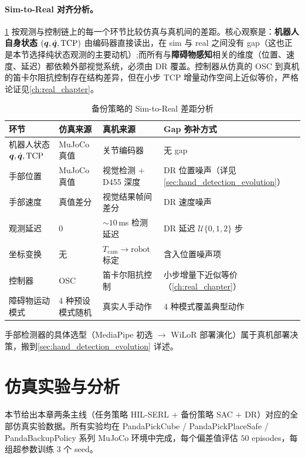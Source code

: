 \paragraph{Sim-to-Real 对齐分析。}\cref{tab:backup_sim2real} 按观测与控制链上的每一个环节比较仿真与真机间的差距。核心观察是：\textbf{机器人自身状态} $(\bm{q}, \dot{\bm{q}}, \text{TCP})$ 由编码器直接读出，在 sim 与 real 之间没有 gap（这也正是本节选择纯状态观测的主要动机）;而所有与\textbf{障碍物感知}相关的维度（位置、速度、延迟）都依赖外部视觉系统，必须由 DR 覆盖。控制器从仿真的 OSC 到真机的笛卡尔阻抗控制存在结构差异，但在小步 TCP 增量动作空间上近似等价，严格论证见\cref{ch:real_chapter}。

\begin{table}[htbp]
  \centering
  \caption{备份策略的 Sim-to-Real 差距分析}
  \label{tab:backup_sim2real}
  \footnotesize
  \begin{tabular}{@{}llll@{}}
    \toprule
    环节 & 仿真来源 & 真机来源 & Gap 弥补方式 \\
    \midrule
    机器人状态 $\bm{q}, \dot{\bm{q}}, \text{TCP}$ & MuJoCo 真值 & 关节编码器 & 无 gap \\
    手部位置 & MuJoCo 真值 & 视觉检测 $+$ D455 深度 & DR 位置噪声（详见\cref{sec:hand_detection_evolution}） \\
    手部速度 & 真值差分 & 视觉结果帧间差分 & DR 速度噪声 \\
    观测延迟 & $0$ & $\sim 10$\,ms 检测延迟 & DR 延迟 $\mathcal{U}\{0,1,2\}$ 步 \\
    坐标变换 & 无 & $T_\text{cam}\!\to\!\text{robot}$ 标定 & 含入位置噪声项 \\
    控制器 & OSC & 笛卡尔阻抗控制 & 小步增量下近似等价（\cref{ch:real_chapter}） \\
    障碍物运动模式 & 4 种预设模式随机 & 真实人手动作 & 4 种模式覆盖典型动作 \\
    \bottomrule
  \end{tabular}
\end{table}

手部检测器的具体选型（MediaPipe 初选 $\to$ WiLoR 部署演化）属于真机部署决策，搬到\cref{sec:hand_detection_evolution} 详述。

\section{仿真实验与分析}\label{sec:sim_experiments}

本节给出本章两条主线（任务策略 HIL-SERL $+$ 备份策略 SAC $+$ DR）对应的全部仿真实验数据。所有实验均在 PandaPickCube / PandaPickPlaceSafe / PandaBackupPolicy 系列 MuJoCo 环境中完成，每个偏差值评估 $50$ episodes，每组超参数训练 $3$ 个 seed。

